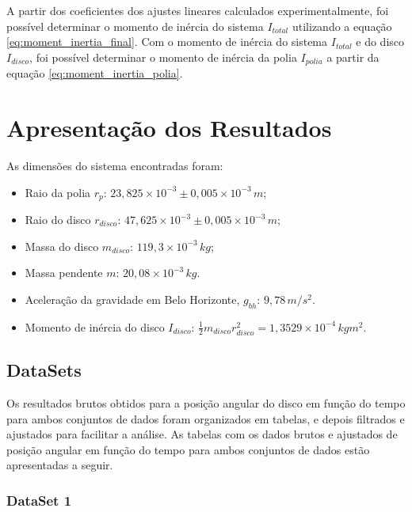 \documentclass[12pt,a4paper]{article}
\begin{document}
A partir dos coeficientes dos ajustes lineares calculados experimentalmente, 
foi possível determinar o momento de inércia do sistema $I_{total}$ utilizando a equação \eqref{eq:moment_inertia_final}. Com o momento de inércia do sistema $I_{total}$ e do disco $I_{disco}$, foi possível determinar o momento de inércia da polia $I_{polia}$ a partir da equação \eqref{eq:moment_inertia_polia}.

\section{Apresentação dos Resultados}

As dimensões do sistema encontradas foram:

\begin{itemize}
    \item Raio da polia $r_p$: $23,825 \times 10^{-3} \pm 0,005 \times 10^{-3}  \, m$;
    \item Raio do disco $r_{disco}$: $47,625\times 10^{-3} \pm 0,005 \times 10^{-3}  \, m$;
    \item Massa do disco $m_{disco}$: $119,3\times 10^{-3}  \, kg$;
    \item Massa pendente $m$: $20,08\times 10^{-3} \, kg$.
    \item Aceleração da gravidade em Belo Horizonte,  $g_{bh}$: $9,78 \, m/s^2$.
    \item Momento de inércia do disco $I_{disco}$: $\frac{1}{2} m_{disco} r_{disco}^2 = 1,3529 \times 10^{-4} \, kg m^2$.
\end{itemize}

\subsection{DataSets}

Os resultados brutos obtidos para a posição angular do disco em função do tempo para ambos conjuntos de dados foram organizados em tabelas, e depois filtrados e ajustados para facilitar a análise. As tabelas com os dados brutos e ajustados de posição angular em função do tempo para ambos conjuntos de dados estão apresentadas a seguir.

\subsubsection{DataSet 1}
\end{document}
